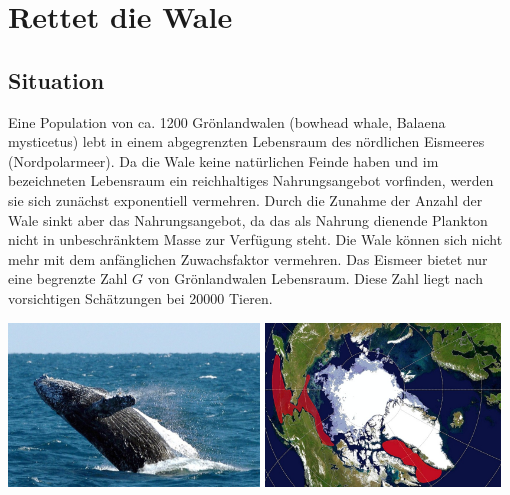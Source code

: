 \documentclass[%
<<<<<<< Updated upstream
<<<<<<< Updated upstream
11pt,%
twoside,%
titlepage,%
german,%
headsepline%
]{scrartcl}
\begin{document}
\clearpage

\appendix

\section{Rettet die Wale}\label{anhang:wale}
\subsection{Situation}
Eine
Population von ca. 1200 Grönlandwalen (bowhead whale, Balaena mysticetus) lebt in einem abgegrenzten Lebensraum des nördlichen Eismeeres (Nordpolarmeer). Da die Wale keine natürlichen Feinde haben und im bezeichneten Lebensraum ein reichhaltiges Nahrungsangebot vorfinden, werden sie sich zunächst exponentiell vermehren. Durch die Zunahme der Anzahl der Wale sinkt aber das Nahrungsangebot, da das als Nahrung dienende Plankton nicht in unbeschränktem Masse zur Verfügung steht. Die Wale können sich nicht mehr mit dem anfänglichen Zuwachsfaktor vermehren. Das Eismeer bietet nur eine begrenzte Zahl $G$ von Grönlandwalen Lebensraum. Diese Zahl liegt nach vorsichtigen Schätzungen bei 20000 Tieren.\\[2ex]

\begin{center}
\includegraphics[width=0.5\textwidth]{pictures/groenlandwale.jpeg}
\includegraphics[width=0.4685\textwidth]{pictures/groenlandwalegebiet.jpg}
\end{center}
\end{document}

